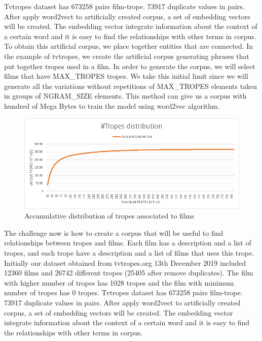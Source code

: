 \documentclass[letterpaper]{article}
\begin{document}
	
	Tvtropes dataset has 673258 pairs film-trope. 73917 duplicate values in pairs. After apply word2vect to artificially created corpus, a set of embedding vectors will be created. The embedding vector integrate information about the context of a certain word and it is easy to find the relationships with other terms in corpus.\\
	To obtain this artificial corpus, we place together entities that are connected. In the example of tvtropes, we create the artificial corpus generating phrases that put together tropes used in a film. In order to generate the corpus, we will select films that have MAX\_TROPES tropes. We take this initial limit since we will generate all the variations without repetitions of MAX\_TROPES elements taken in groups of NGRAM\_SIZE elements. This method can give us a corpus with hundred of Mega Bytes to train the model using word2vec algorithm. \\
	
	\begin{figure}
		\centering
		\includegraphics[width=1\linewidth]{../images/tropes_distribution_chart.png}
		\caption{Accumulative distribution of tropes associated to films}
		\label{fig:tropesdistributionasociatedtofilms}
	\end{figure}
	
	The challenge now is how to create a corpus that will be useful to find relationships between tropes and films. Each film has a description and a list of tropes, and each trope have a description and a list of films that uses this trope. Initially our dataset obtained from tvtropes.org 13th December 2019 included 12360 films and 26742 different tropes (25405 after remove duplicates). The film with higher number of tropes has 1028 tropes and the film with minimum number of tropes has 0 tropes. Tvtropes dataset has 673258 pairs film-trope. 73917 duplicate values in pairs. After apply word2vect to artificially created corpus, a set of embedding vectors will be created. The embedding vector integrate information about the context of a certain word and it is easy to find the relationships with other terms in corpus.\\
	
\end{document}
